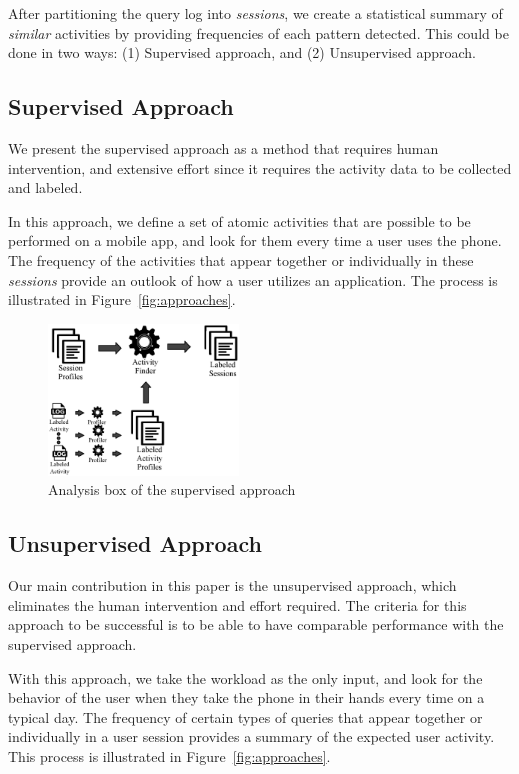 After partitioning the query log into \emph{sessions}, we create a statistical summary of \emph{similar} activities by providing frequencies of each pattern detected. This could be done in two ways: (1) Supervised approach, and (2) Unsupervised approach.

\subsection{Supervised Approach}
\label{sec:supervised}
We present the supervised approach as a method that requires human intervention, and extensive effort since it requires the activity data to be collected and labeled.

In this approach, we define a set of atomic activities that are possible to be performed on a mobile app, and look for them every time a user uses the phone. The frequency of the activities that appear together or individually in these \emph{sessions} provide an outlook of how a user utilizes an application. The process is illustrated in Figure~\ref{fig:approaches}.


\begin{figure}[h!]
    \centering
    \includegraphics[width=0.45\textwidth]{graphics/supervised}
    \caption{Analysis box of the supervised approach}
    \label{fig:supervised}
\end{figure}


\subsection{Unsupervised Approach}
\label{sec:unsupervised}

Our main contribution in this paper is the unsupervised approach, which eliminates the human intervention and effort required. The criteria for this approach to be successful is to be able to have comparable performance with the supervised approach.

With this approach, we take the workload as the only input, and look for the behavior of the user when they take the phone in their hands every time on a typical day. The frequency of certain types of queries that appear together or individually in a user session provides a summary of the expected user activity.  This process is illustrated in Figure~\ref{fig:approaches}.

